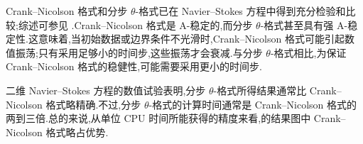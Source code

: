 \begin{note}
\label{note:theta-scheme-experience}
Crank--Nicolson 格式和分步 $\theta$-格式已在 Navier--Stokes 方程中得到充分检验和比较;综述可参见 \textcite{Emmrich2001}.Crank--Nicolson 格式是 A-稳定的,而分步 $\theta$-格式甚至具有强 A-稳定性.这意味着,当初始数据或边界条件不光滑时,Crank--Nicolson 格式可能引起数值振荡;只有采用足够小的时间步,这些振荡才会衰减.与分步 $\theta$-格式相比,为保证 Crank--Nicolson 格式的稳健性,可能需要采用更小的时间步.

二维 Navier--Stokes 方程的数值试验\parencite{JohnRang2010,JohnMatthiesRang2006a}表明,分步 $\theta$-格式所得结果通常比 Crank--Nicolson 格式略精确.不过,分步 $\theta$-格式的计算时间通常是 Crank--Nicolson 格式的两到三倍.总的来说,从单位 CPU 时间所能获得的精度来看,\textcite{JohnRang2010}的结果图中 Crank--Nicolson 格式略占优势.
\end{note}

